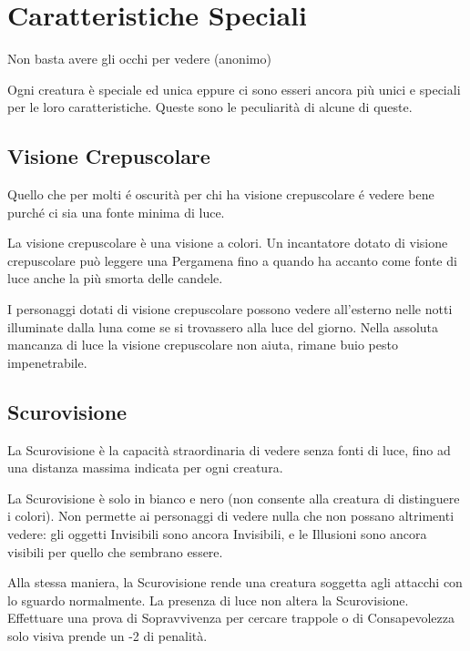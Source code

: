 \section{Caratteristiche Speciali}

\begin{enfasi}{
Non basta avere gli occhi per vedere (anonimo)
}\end{enfasi}

\begin{multicols}{2}

Ogni creatura è speciale ed unica eppure ci sono esseri ancora più unici e speciali per le loro caratteristiche. Queste sono le peculiarità di alcune di queste.

\subsection{Visione Crepuscolare}\label{visionecrepuscolare}

Quello che per molti é oscurità per chi ha \hypertarget{visionecrepuscolare}{visione crepuscolare} é vedere bene purché ci sia una fonte minima di luce.

La visione crepuscolare è una visione a colori.
Un incantatore dotato di visione crepuscolare può leggere una Pergamena fino a quando ha accanto come fonte di luce anche la più smorta delle candele.

I personaggi dotati di visione crepuscolare possono vedere all'esterno nelle notti illuminate dalla luna come se si trovassero alla luce del giorno.
Nella assoluta mancanza di luce la visione crepuscolare non aiuta, rimane buio pesto impenetrabile.

\subsection{Scurovisione}\label{scurovisione}

La Scurovisione è la capacità straordinaria di vedere senza fonti di luce, fino ad una distanza massima indicata per ogni creatura.

La Scurovisione è solo in bianco e nero (non consente alla creatura di distinguere i colori). Non permette ai personaggi di vedere nulla che non possano altrimenti vedere: gli oggetti Invisibili sono ancora Invisibili, e le Illusioni sono ancora visibili per quello che sembrano essere.

Alla stessa maniera, la Scurovisione rende una creatura soggetta agli attacchi con lo sguardo normalmente. La presenza di luce non altera la Scurovisione.
Effettuare una prova di Sopravvivenza per cercare trappole o di Consapevolezza solo visiva prende un -2 di penalità.


\end{multicols}
